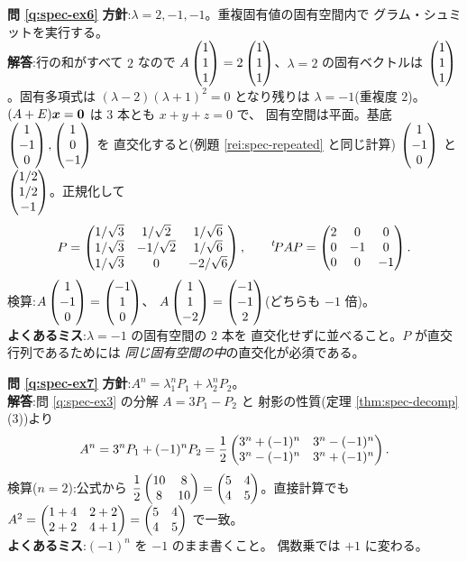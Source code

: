 \bigskip
\noindent\textbf{問 \ref{q:spec-ex6}}\quad
\textbf{方針}:$\lambda = 2, -1, -1$。重複固有値の固有空間内で
グラム・シュミットを実行する。\\
\textbf{解答}:行の和がすべて $2$ なので
$A\begin{pmatrix}1\\1\\1\end{pmatrix} = 2\begin{pmatrix}1\\1\\1\end{pmatrix}$、$\lambda = 2$ の固有ベクトルは
$\begin{pmatrix}1 \\ 1 \\ 1\end{pmatrix}$。固有多項式は
$(\lambda - 2)(\lambda + 1)^2 = 0$ となり残りは $\lambda = -1$(重複度 $2$)。
$(A + E)\bm{x} = \bm{0}$ は $3$ 本とも $x + y + z = 0$ で、
固有空間は平面。基底 $\begin{pmatrix}1 \\ -1 \\ 0\end{pmatrix}, \begin{pmatrix}1 \\ 0 \\ -1\end{pmatrix}$ を
直交化すると(例題 \ref{rei:spec-repeated} と同じ計算)
$\begin{pmatrix}1 \\ -1 \\ 0\end{pmatrix}$ と $\begin{pmatrix}1/2 \\ 1/2 \\ -1\end{pmatrix}$。正規化して
\[
P = \begin{pmatrix}1/\sqrt{3} & 1/\sqrt{2} & 1/\sqrt{6} \\
1/\sqrt{3} & -1/\sqrt{2} & 1/\sqrt{6} \\
1/\sqrt{3} & 0 & -2/\sqrt{6}\end{pmatrix}, \qquad
{}^t\!PAP = \begin{pmatrix}2 & 0 & 0 \\ 0 & -1 & 0 \\ 0 & 0 & -1\end{pmatrix}.
\]
検算:$A\begin{pmatrix}1 \\ -1 \\ 0\end{pmatrix} = \begin{pmatrix}-1 \\ 1 \\ 0\end{pmatrix}$、
$A\begin{pmatrix}1 \\ 1 \\ -2\end{pmatrix} = \begin{pmatrix}-1 \\ -1 \\ 2\end{pmatrix}$(どちらも $-1$ 倍)。\\
\textbf{よくあるミス}:$\lambda = -1$ の固有空間の $2$ 本を
直交化せずに並べること。$P$ が直交行列であるためには
\emph{同じ固有空間の中}の直交化が必須である。

\bigskip
\noindent\textbf{問 \ref{q:spec-ex7}}\quad
\textbf{方針}:$A^n = \lambda_1^nP_1 + \lambda_2^nP_2$。\\
\textbf{解答}:問 \ref{q:spec-ex3} の分解 $A = 3P_1 - P_2$ と
射影の性質(定理 \ref{thm:spec-decomp}(3))より
\[
A^n = 3^nP_1 + (-1)^nP_2
= \frac{1}{2}\begin{pmatrix}3^n + (-1)^n & 3^n - (-1)^n \\ 3^n - (-1)^n & 3^n + (-1)^n\end{pmatrix}.
\]
検算($n = 2$):公式から $\dfrac{1}{2}\begin{pmatrix}10 & 8 \\ 8 & 10\end{pmatrix}
= \begin{pmatrix}5 & 4 \\ 4 & 5\end{pmatrix}$。直接計算でも
$A^2 = \begin{pmatrix}1 + 4 & 2 + 2 \\ 2 + 2 & 4 + 1\end{pmatrix} = \begin{pmatrix}5 & 4 \\ 4 & 5\end{pmatrix}$ で一致。\\
\textbf{よくあるミス}:$(-1)^n$ を $-1$ のまま書くこと。
偶数乗では $+1$ に変わる。

